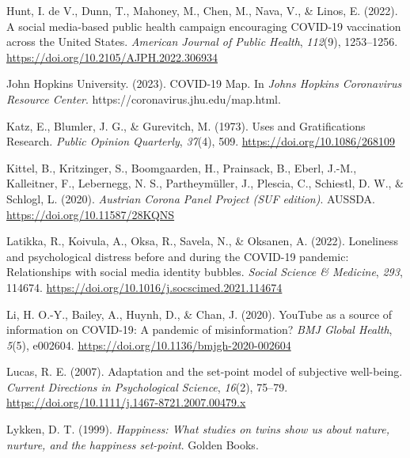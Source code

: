 \documentclass[
  man,mask,floatsintext]{apa7}
\newlength{\cslhangindent}
\newlength{\cslentryspacingunit} %
\newenvironment{CSLReferences}[2] %
 {%
  \setlength{\parindent}{0pt}
  \ifodd #1
  \let\oldpar\par
  \def\par{\hangindent=\cslhangindent\oldpar}
  \fi
  \setlength{\parskip}{#2\cslentryspacingunit}
 }%
 {}
\begin{document}
\begin{CSLReferences}{1}{0}
\leavevmode{}%
Hunt, I. de V., Dunn, T., Mahoney, M., Chen, M., Nava, V., \& Linos, E. (2022). A social media-based public health campaign encouraging {COVID-19} vaccination across the {United States}. \emph{American Journal of Public Health}, \emph{112}(9), 1253--1256. \url{https://doi.org/10.2105/AJPH.2022.306934}

\leavevmode{}%
John Hopkins University. (2023). {COVID-19 Map}. In \emph{Johns Hopkins Coronavirus Resource Center}. https://coronavirus.jhu.edu/map.html.

\leavevmode{}%
Katz, E., Blumler, J. G., \& Gurevitch, M. (1973). Uses and {Gratifications Research}. \emph{Public Opinion Quarterly}, \emph{37}(4), 509. \url{https://doi.org/10.1086/268109}

\leavevmode{}%
Kittel, B., Kritzinger, S., Boomgaarden, H., Prainsack, B., Eberl, J.-M., Kalleitner, F., Lebernegg, N. S., Partheymüller, J., Plescia, C., Schiestl, D. W., \& Schlogl, L. (2020). \emph{Austrian {Corona Panel Project} ({SUF} edition)}. {AUSSDA}. \url{https://doi.org/10.11587/28KQNS}

\leavevmode{}%
Latikka, R., Koivula, A., Oksa, R., Savela, N., \& Oksanen, A. (2022). Loneliness and psychological distress before and during the {COVID-19} pandemic: {Relationships} with social media identity bubbles. \emph{Social Science \& Medicine}, \emph{293}, 114674. \url{https://doi.org/10.1016/j.socscimed.2021.114674}

\leavevmode{}%
Li, H. O.-Y., Bailey, A., Huynh, D., \& Chan, J. (2020). {YouTube} as a source of information on {COVID-19}: A pandemic of misinformation? \emph{BMJ Global Health}, \emph{5}(5), e002604. \url{https://doi.org/10.1136/bmjgh-2020-002604}

\leavevmode{}%
Lucas, R. E. (2007). Adaptation and the set-point model of subjective well-being. \emph{Current Directions in Psychological Science}, \emph{16}(2), 75--79. \url{https://doi.org/10.1111/j.1467-8721.2007.00479.x}

\leavevmode{}%
Lykken, D. T. (1999). \emph{Happiness: {What} studies on twins show us about nature, nurture, and the happiness set-point}. {Golden Books}.


\end{CSLReferences}
\end{document}
